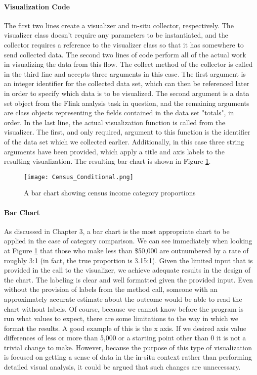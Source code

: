 \paragraph{Visualization Code}
The first two lines create a visualizer and in-situ collector, respectively. The visualizer class doesn't require any parameters to be instantiated, and the collector requires a reference to the visualizer class so that it has somewhere to send collected data. The second two lines of code perform all of the actual work in visualizing the data from this flow. The collect method of the collector is called in the third line and accepts three arguments in this case. The first argument is an integer identifier for the collected data set, which can then be referenced later in order to specify which data is to be visualized. The second argument is a data set object from the Flink analysis task in question, and the remaining arguments are class objects representing the fields contained in the data set "totals", in order. In the last line, the actual visualization function is called from the visualizer. The first, and only required, argument to this function is the identifier of the data set which we collected earlier. Additionally, in this case three string arguments have been provided, which apply a title and axis labels to the resulting visualization. The resulting bar chart is shown in Figure \ref{fig:conditional}.     

\begin{figure}
	\centering
	\label{fig:conditional}
	\texttt{[image: Census\_Conditional.png]}
	\caption{A bar chart showing census income category proportions}
\end{figure}

\paragraph{Bar Chart}
As discussed in Chapter 3, a bar chart is the most appropriate chart to be applied in the case of category comparison. We can see immediately when looking at Figure \ref{fig:conditional} that those who make less than \$50,000 are outnumbered by a rate of roughly 3:1 (in fact, the true proportion is 3.15:1). Given the limited input that is provided in the call to the visualizer, we achieve adequate results in the design of the chart. The labeling is clear and well formatted given the provided input. Even without the provision of labels from the method call, someone with an approximately accurate estimate about the outcome would be able to read the chart without labels. Of course, because we cannot know before the  program is run what values to expect, there are some limitations to the way in which we format the results. A good example of this is the x axis. If we desired axis value differences of less or more than 5,000 or a starting point other than 0 it is not a trivial change to make. However, because the purpose of this type of visualization is focused on getting a sense of data in the in-situ context rather than performing detailed visual analysis, it could be argued that such changes are unnecessary.

